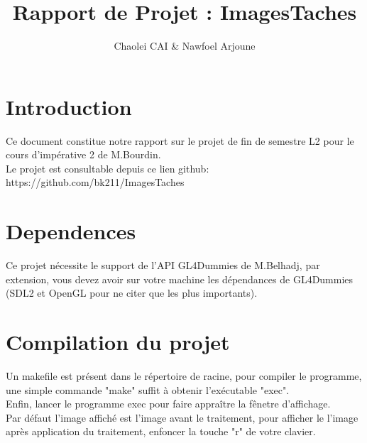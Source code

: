 \documentclass[12pt, letterpaper]{article}
\title{Rapport de Projet : ImagesTaches}
\author{Chaolei CAI \& Nawfoel Arjoune}
\begin{document}
\begin{titlepage}
\maketitle
\end{titlepage}

\tableofcontents
\section{Introduction}
Ce document constitue notre rapport sur le projet de fin de semestre L2 pour le cours d'impérative 2 de M.Bourdin. \\
Le projet est consultable depuis ce lien github: https://github.com/bk211/ImagesTaches\\


\section{Dependences}
Ce projet nécessite le support de l'API GL4Dummies de M.Belhadj, 
par extension, vous devez avoir sur votre machine les dépendances de GL4Dummies 
(SDL2 et OpenGL pour ne citer que les plus importants).

\section{Compilation du projet}
Un makefile est présent dans le répertoire de racine, pour compiler le programme, une simple
commande "make" suffit à obtenir l'exécutable "exec".\\
Enfin, lancer le programme exec pour faire appraître la fênetre d'affichage.\\
Par défaut l'image affiché est l'image avant le traitement, 
pour afficher le l'image après application du traitement, enfoncer la touche "r" de votre clavier.\\
\end{document}
